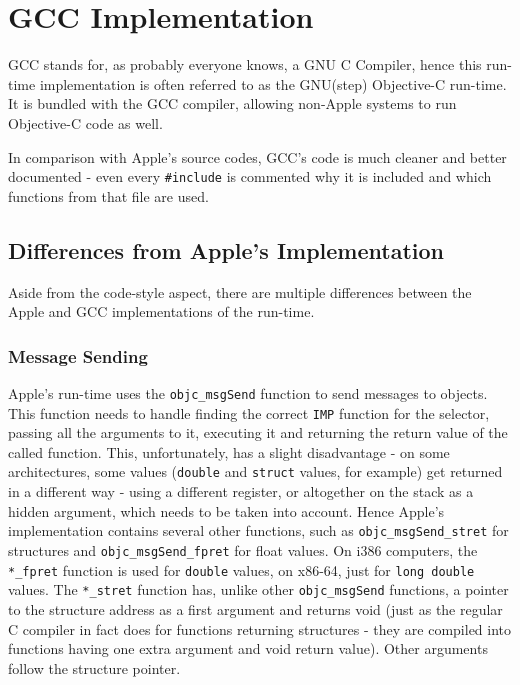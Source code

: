 \chapter{GCC Implementation}

GCC stands for, as probably everyone knows, a GNU C Compiler, hence this run-time implementation is often referred to as the GNU(step) Objective-C run-time. It is bundled with the GCC compiler, allowing non-Apple systems to run Objective-C code as well.

In comparison with Apple's source codes, GCC's code is much cleaner and better documented - even every \verb=#include= is commented why it is included and which functions from that file are used.

\section{Differences from Apple's Implementation}

Aside from the code-style aspect, there are multiple differences between the Apple and GCC implementations of the run-time.

\subsection{Message Sending}
Apple's run-time uses the \verb=objc_msgSend= function to send messages to objects. This function needs to handle finding the correct \verb=IMP= function for the selector, passing all the arguments to it, executing it and returning the return value of the called function. This, unfortunately, has a slight disadvantage - on some architectures, some values (\verb=double= and \verb=struct= values, for example) get returned in a different way - using a different register, or altogether on the stack as a hidden argument, which needs to be taken into account. Hence Apple's implementation contains several other functions, such as \verb=objc_msgSend_stret= for structures and \verb=objc_msgSend_fpret= for float values. On i386 computers, the \verb=*_fpret= function is used for \verb=double= values, on x86-64, just for \verb=long double= values. The \verb=*_stret= function has, unlike other \verb=objc_msgSend= functions, a pointer to the structure address as a first argument and returns void (just as the regular C compiler in fact does for functions returning structures - they are compiled into functions having one extra argument and void return value). Other arguments follow the structure pointer.


